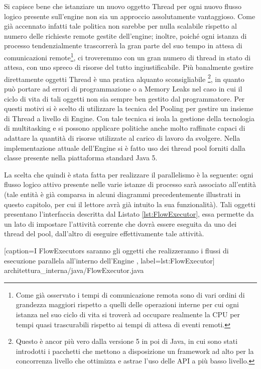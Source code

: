 Si capisce bene che istanziare un nuovo oggetto Thread per ogni nuovo flusso
logico presente sull'engine non sia un approccio assolutamente vantaggioso. Come
già accennato infatti tale politica non sarebbe per nulla scalabile rispetto al
numero delle richieste remote gestite dell'engine; inoltre, poiché ogni istanza
di processo tendenzialmente trascorrerà la gran parte del suo tempo in attesa di
comunicazioni remote\footnote{Come già osservato i tempi di comunicazione remota
sono di vari ordini di grandezza maggiori rispetto a quelli delle operazioni
interne per cui ogni istanza nel suo ciclo di vita si troverà ad occupare
realmente la CPU per tempi quasi trascurabili rispetto ai tempi di attesa di
eventi remoti.}, ci troveremmo con un gran numero di thread in stato di attesa,
con uno spreco di risorse del tutto ingiustificabile. Più banalmente gestire
direttamente oggetti Thread \`e una pratica alquanto sconsigliabile
\footnote{Questo \`e ancor pi\`u vero dalla versione 5 in poi di Java, in cui
sono stati introdotti i pacchetti  che mettono a
disposizione un framework ad alto per la concorrenza livello che ottimizza e
astrae l'uso delle API a più basso livello.}, in quanto può portare ad errori di
programmazione o a Memory Leaks nel caso in cui il ciclo di vita di tali oggetti
non sia sempre ben gestito dal programmatore. Per questi motivi si \`e scelto di
utilizzare la tecnica del Pooling per gestire un insieme di Thread a livello di
Engine. Con tale tecnica si isola la gestione della tecnologia di multitasking e
si possono applicare politiche anche molto raffinate capaci di adattare la
quantità di risorse utilizzate al carico di lavoro da svolgere. Nella
implementazione attuale dell'Engine si \`e fatto uso dei thread pool forniti
dalla classe  presente nella piattaforma
standard Java 5.
 
La scelta che quindi \`e stata fatta per realizzare il parallelismo \`e la
seguente: ogni flusso logico attivo presente nelle varie istanze di processo sarà
associato all'entità  (tale entità \`e già comparsa in alcuni
diagrammi precedentemente illustrati in questo capitolo, per cui il lettore avrà
già intuito la sua funzionalità). Tali oggetti presentano l'interfaccia
descritta dal Listato \ref{lst:FlowExecutor}, essa permette da un lato di
impostare l'attività corrente che dovrà essere eseguita da uno dei thread del pool, 
dall'altro di eseguire effettivamente tale attività.


[caption={I FlowExecutors saranno gli oggetti che realizzeranno i flussi di
esecuzione parallela all'interno dell'Engine }, label=lst:FlowExecutor]
{architettura_interna/java/FlowExecutor.java}


